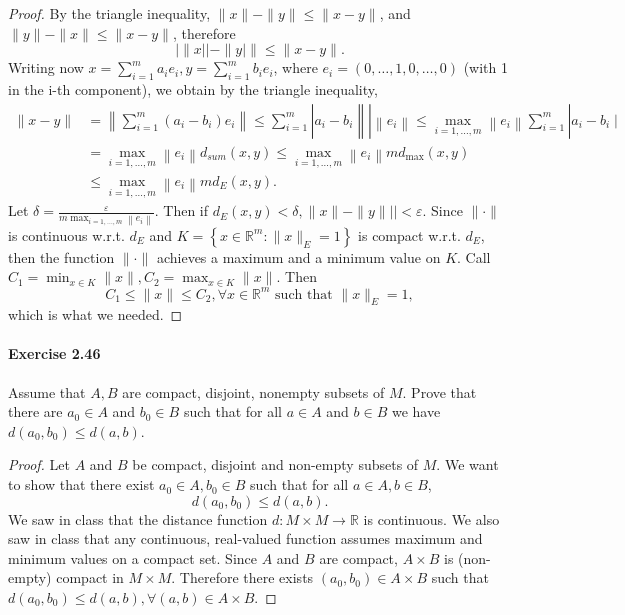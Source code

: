 \documentclass{article}
\begin{document}
\begin{proof}
By the triangle inequality, $\|x\|-\|y\| \leq\|x-y\|$, and $\|y\|-\|x\| \leq\|x-y\|$, therefore
$$
|\|x||-\| y|\|\leq\| x-y \| .
$$
Writing now $x=\sum_{i=1}^m a_i e_i, y=\sum_{i=1}^m b_i e_i$, where $e_i=(0, \ldots, 1,0, \ldots, 0)$ (with 1 in the i-th component), we obtain by the triangle inequality,
$$
\begin{aligned}
\|x-y\| & =\left\|\sum_{i=1}^m\left(a_i-b_i\right) e_i\right\| \leq \sum_{i=1}^m\left|a_i-b_i\left\|\left|\left\|e_i\right\| \leq \max _{i=1, \ldots, m}\left\|e_i\right\| \sum_{i=1}^m\right| a_i-b_i \mid\right.\right. \\
& =\max _{i=1, \ldots, m}\left\|e_i\right\| d_{s u m}(x, y) \leq \max _{i=1, \ldots, m}\left\|e_i\right\| m d_{\max }(x, y) \\
& \leq \max _{i=1, \ldots, m}\left\|e_i\right\| m d_E(x, y) .
\end{aligned}
$$
Let $\delta=\frac{\varepsilon}{m \max _{i=1, \ldots, m}\left\|e_i\right\|}$. Then if $d_E(x, y)<\delta,\|x\|-\|y\|||<\varepsilon$.
Since $\|\cdot\|$ is continuous w.r.t. $d_E$ and $K=\left\{x \in \mathbb{R}^m:\|x\|_E=1\right\}$ is compact w.r.t. $d_E$, then the function $\|\cdot\|$ achieves a maximum and a minimum value on $K$. Call $C_1=\min _{x \in K}\|x\|, C_2=\max _{x \in K}\|x\|$. Then
$$
C_1 \leq\|x\| \leq C_2, \forall x \in \mathbb{R}^m \text { such that }\|x\|_E=1,
$$
which is what we needed.
\end{proof}



\paragraph{Exercise 2.46} Assume that $A, B$ are compact, disjoint, nonempty subsets of $M$. Prove that there are $a_0 \in A$ and $b_0 \in B$ such that for all $a \in A$ and $b \in B$ we have $d(a_0, b_0) \leq d(a, b)$.
\begin{proof}
Let $A$ and $B$ be compact, disjoint and non-empty subsets of $M$. We want to show that there exist $a_0 \in A, b_0 \in B$ such that for all $a \in A, b \in B$,
$$
d\left(a_0, b_0\right) \leq d(a, b) .
$$
We saw in class that the distance function $d: M \times M \rightarrow \mathbb{R}$ is continuous. We also saw in class that any continuous, real-valued function assumes maximum and minimum values on a compact set. Since $A$ and $B$ are compact, $A \times B$ is (non-empty) compact in $M \times M$. Therefore there exists $\left(a_0, b_0\right) \in A \times B$ such that $d\left(a_0, b_0\right) \leq d(a, b), \forall(a, b) \in A \times B$.
\end{proof}
\end{document}
